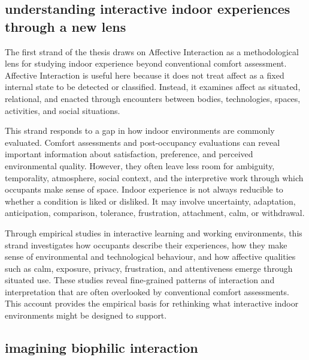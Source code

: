 \subsection{understanding interactive indoor experiences through a new lens}

The first strand of the thesis draws on Affective Interaction as a methodological lens for studying indoor experience beyond conventional comfort assessment. Affective Interaction is useful here because it does not treat affect as a fixed internal state to be detected or classified. Instead, it examines affect as situated, relational, and enacted through encounters between bodies, technologies, spaces, activities, and social situations.

This strand responds to a gap in how indoor environments are commonly evaluated. Comfort assessments and post-occupancy evaluations can reveal important information about satisfaction, preference, and perceived environmental quality. However, they often leave less room for ambiguity, temporality, atmosphere, social context, and the interpretive work through which occupants make sense of space. Indoor experience is not always reducible to whether a condition is liked or disliked. It may involve uncertainty, adaptation, anticipation, comparison, tolerance, frustration, attachment, calm, or withdrawal.

Through empirical studies in interactive learning and working environments, this strand investigates how occupants describe their experiences, how they make sense of environmental and technological behaviour, and how affective qualities such as calm, exposure, privacy, frustration, and attentiveness emerge through situated use. These studies reveal fine-grained patterns of interaction and interpretation that are often overlooked by conventional comfort assessments. This account provides the empirical basis for rethinking what interactive indoor environments might be designed to support.

\subsection{imagining biophilic interaction}

